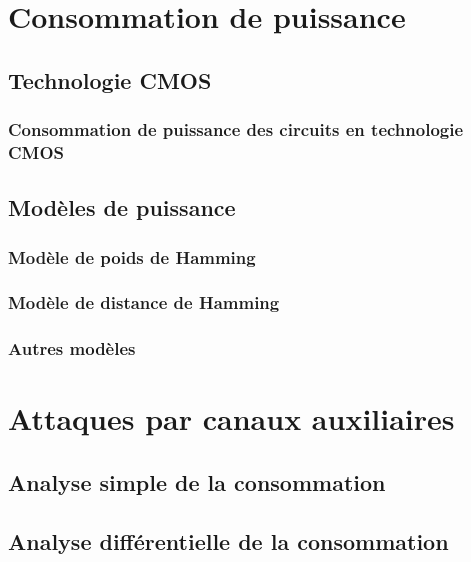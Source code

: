 \documentclass[oneside]{book}
\begin{document}
\chapter{Consommation de puissance}

\section{Technologie CMOS}
\label{sec:Introduction}

\subsection{Consommation de puissance des circuits en technologie CMOS}
\label{sec:Introduction}

\section{Modèles de puissance}
\label{sec:Introduction}

\subsection{Modèle de poids de Hamming}
\label{sec:Introduction}

\subsection{Modèle de distance de Hamming}
\label{sec:Introduction}

\subsection{Autres modèles}
\label{sec:Introduction}

\newpage


\chapter{Attaques par canaux auxiliaires}

\section{Analyse simple de la consommation}
\label{sec:Introduction}

\section{Analyse différentielle de la consommation}
\label{sec:Introduction}
\end{document}
